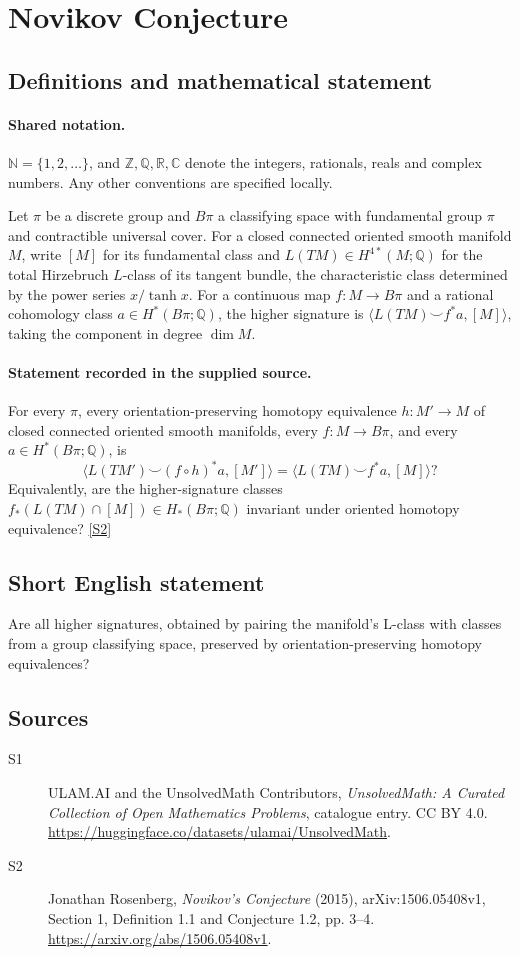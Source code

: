 \documentclass[11pt]{article}
\newcommand{\sref}[2]{\hyperlink{source:#1:#2}{[S#2]}}
\begin{document}
\section{Novikov Conjecture}\label{statement}

\subsection{Definitions and mathematical statement}

\paragraph{Shared notation.}$\mathbb N=\{1,2,\ldots\}$, and $\mathbb Z,\mathbb Q,\mathbb R,\mathbb C$ denote the integers, rationals, reals and complex numbers. Any other conventions are specified locally.


Let $\pi$ be a discrete group and $B\pi$ a classifying space with fundamental group $\pi$ and contractible universal cover. For a closed connected oriented smooth manifold $M$, write $[M]$ for its fundamental class and $L(TM)\in H^{4*}(M;\mathbb Q)$ for the total Hirzebruch $L$-class of its tangent bundle, the characteristic class determined by the power series $x/\tanh x$. For a continuous map $f:M\to B\pi$ and a rational cohomology class $a\in H^*(B\pi;\mathbb Q)$, the higher signature is $\langle L(TM)\smile f^*a,[M]\rangle$, taking the component in degree $\dim M$.
\paragraph{Statement recorded in the supplied source.}
For every $\pi$, every orientation-preserving homotopy equivalence $h:M'\to M$ of closed connected oriented smooth manifolds, every $f:M\to B\pi$, and every $a\in H^*(B\pi;\mathbb Q)$, is
\[
 \langle L(TM')\smile(f\circ h)^*a,[M']\rangle
 =\langle L(TM)\smile f^*a,[M]\rangle?
\]
Equivalently, are the higher-signature classes $f_*(L(TM)\cap[M])\in H_*(B\pi;\mathbb Q)$ invariant under oriented homotopy equivalence? \sref{statement}{2}
\subsection{Short English statement}
Are all higher signatures, obtained by pairing the manifold’s L-class with classes from a group classifying space, preserved by orientation-preserving homotopy equivalences?
\subsection{Sources}
\begin{description}
\item[\hypertarget{source:statement:1}{S1}] ULAM.AI and the UnsolvedMath Contributors, \emph{UnsolvedMath: A Curated Collection of Open Mathematics Problems}, catalogue entry. CC BY 4.0. \url{https://huggingface.co/datasets/ulamai/UnsolvedMath}.
\item[\hypertarget{source:statement:2}{S2}] Jonathan Rosenberg, \emph{Novikov's Conjecture} (2015), arXiv:1506.05408v1, Section 1, Definition 1.1 and Conjecture 1.2, pp. 3--4. \url{https://arxiv.org/abs/1506.05408v1}.
\end{description}
\label{end:statement}
\end{document}
